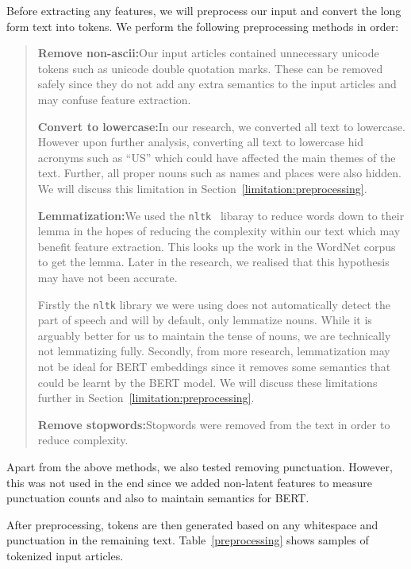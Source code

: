 \documentclass{article}
\begin{document}
\label{section:preprocessing}

Before extracting any features, we will preprocess our input and convert the long form text into tokens. We perform the following preprocessing methods in order:

\begin{quote}
  \textbf{Remove non-ascii:}\quad Our input articles contained unnecessary unicode tokens such as unicode double quotation marks. These can be removed safely since they do not add any extra semantics to the input articles and may confuse feature extraction.

  \textbf{Convert to lowercase:}\quad In our research, we converted all text to lowercase. However upon further analysis, converting all text to lowercase hid acronyms such as ``US'' which could have affected the main themes of the text. Further, all proper nouns such as names and places were also hidden. We will discuss this limitation in Section~\ref{limitation:preprocessing}.

  \textbf{Lemmatization:}\quad We used the \verb|nltk|~\cite{nltk} libaray to reduce words down to their lemma in the hopes of reducing the complexity within our text which may benefit feature extraction. This looks up the work in the WordNet corpus to get the lemma. Later in the research, we realised that this hypothesis may have not been accurate.

  Firstly the \verb|nltk| library we were using does not automatically detect the part of speech and will by default, only lemmatize nouns. While it is arguably better for us to maintain the tense of nouns, we are technically not lemmatizing fully. Secondly, from more research, lemmatization may not be ideal for BERT embeddings since it removes some semantics that could be learnt by the BERT model. We will discuss these limitations further in Section~\ref{limitation:preprocessing}.

  \textbf{Remove stopwords:}\quad Stopwords were removed from the text in order to reduce complexity.
\end{quote}

Apart from the above methods, we also tested removing punctuation. However, this was not used in the end since we added non-latent features to measure punctuation counts and also to maintain semantics for BERT.

After preprocessing, tokens are then generated based on any whitespace and punctuation in the remaining text. Table~\ref{preprocessing} shows samples of tokenized input articles.
\end{document}
